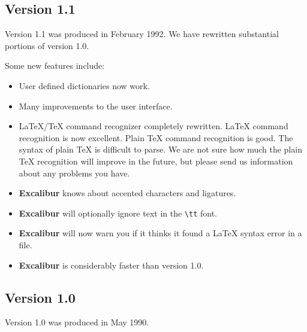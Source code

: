 \documentclass[11pt,titlepage]{article}
\newcommand{\ex}{\textbf{Excalibur}}
\begin{document}
\subsection{Version 1.1}

Version 1.1 was produced in February 1992. We have rewritten
substantial portions of version 1.0.

Some new features include:

\begin{itemize}
\item User defined dictionaries now work.

\item Many improvements to the user interface.

\item \LaTeX/\TeX{} command recognizer completely rewritten.  \LaTeX{}
  command recognition is now excellent. Plain \TeX{} command
  recognition is good. The syntax of plain \TeX{} is difficult to
  parse. We are not sure how much the plain \TeX{} recognition will
  improve in the future, but please send us information about any
  problems you have.

\item \ex{} knows about accented characters and ligatures.

\item \ex{} will optionally ignore text in the \verb+\tt+ font.

\item \ex{} will now warn you if it thinks it found a \LaTeX{} syntax
  error in a file.

\item \ex{} is considerably faster than version 1.0.
\end{itemize}

\subsection{Version 1.0}

Version 1.0 was produced in May 1990.
\end{document}
